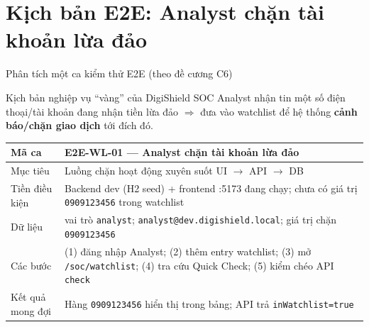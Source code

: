\documentclass[aspectratio=169,12pt]{beamer}
\begin{document}
\section{Kịch bản E2E: Analyst chặn tài khoản lừa đảo}

\begin{frame}{Phân tích một ca kiểm thử E2E (theo đề cương C6)}
  \begin{block}{Kịch bản nghiệp vụ ``vàng'' của DigiShield}
    SOC Analyst nhận tin một số điện thoại/tài khoản đang nhận tiền
    lừa đảo $\Rightarrow$ đưa vào watchlist để hệ thống
    \textbf{cảnh báo/chặn giao dịch} tới đích đó.
  \end{block}

  \begin{center}
  \footnotesize
  \begin{tabular}{p{2.6cm}p{8.8cm}}
    \toprule
    \textbf{Mã ca} & E2E-WL-01 --- Analyst chặn tài khoản lừa đảo \\
    \midrule
    Mục tiêu & Luồng chặn hoạt động xuyên suốt UI $\to$ API $\to$ DB \\
    Tiền điều kiện & Backend dev (H2 seed) + frontend :5173 đang chạy;
      chưa có giá trị \texttt{0909123456} trong watchlist \\
    Dữ liệu & vai trò \texttt{analyst};
      \texttt{analyst@dev.digishield.local};
      giá trị chặn \texttt{0909123456} \\
    Các bước & (1) đăng nhập Analyst; (2) thêm entry watchlist;
      (3) mở \texttt{/soc/watchlist}; (4) tra cứu Quick Check;
      (5) kiểm chéo API \texttt{check} \\
    Kết quả mong đợi & Hàng \texttt{0909123456} hiển thị trong bảng;
      API trả \texttt{inWatchlist=true} \\
    \bottomrule
  \end{tabular}
  \end{center}
\end{frame}
\end{document}
